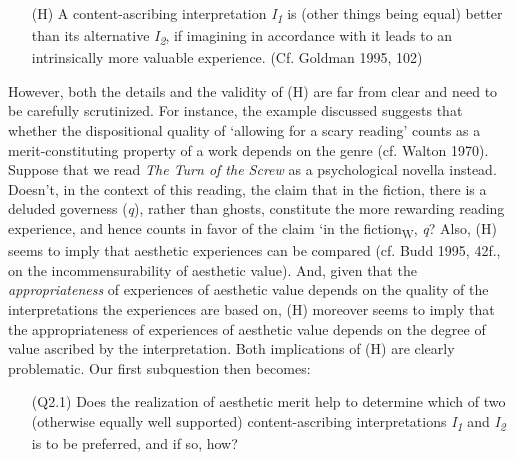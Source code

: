 \vspace{-.1cm}
\begin{itemize}[leftmargin=2cm]
\item[(H)] A content-ascribing interpretation \emph{I\textsubscript{1}} is (other things being equal) better than its alternative \emph{I\textsubscript{2}}, if imagining in accordance with it leads to an intrinsically more valuable experience. (Cf. Goldman 1995, 102)
\end{itemize}
\vspace{-.1cm}

\noindent However, both the details and the validity of (H) are far from clear and need to be carefully scrutinized. For instance, the example discussed suggests that whether the dispositional quality of `allowing for a scary reading' counts as a merit-constituting property of a work depends on the genre (cf. Walton 1970). Suppose that we read \emph{The Turn of the Screw} as a psychological novella instead.{~ }Doesn't, in the context of this reading, the claim that in the fiction, there is a deluded governess (\emph{q}), rather than ghosts, constitute the more rewarding reading experience, and hence counts in favor of the claim `in the fiction\textsubscript{W}, \emph{q}? Also, (H) seems to imply that aesthetic experiences can be compared (cf. Budd 1995, 42f., on the incommensurability of aesthetic value). And, given that the \emph{appropriateness} of experiences of aesthetic value depends on the quality of the interpretations the experiences are based on, (H) moreover seems to imply that the appropriateness of experiences of aesthetic value depends on the degree of value ascribed by the interpretation. Both implications of (H) are clearly problematic. Our first subquestion then becomes:

\vspace{-.1cm}
\begin{itemize}[leftmargin=2cm]
\item[(Q2.1)] Does the realization of aesthetic merit help to determine which of two (otherwise equally well supported) content-ascribing interpretations \emph{I\textsubscript{1}} and \emph{I\textsubscript{2}} is to be preferred, and if so, how?
\end{itemize}
\vspace{-.1cm}

